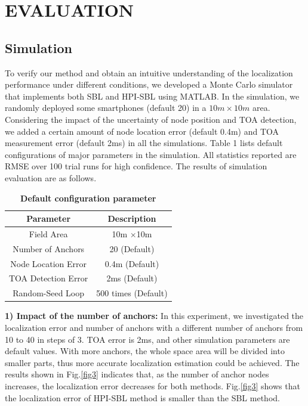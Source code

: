 \section{EVALUATION }
\label{section:results}

\subsection{Simulation}
To verify our method and obtain an intuitive understanding of the localization performance under different conditions,
we developed a Monte Carlo simulator that implements
both SBL and HPI-SBL using MATLAB. 
In the simulation, we randomly deployed some smartphones (default 20) in a $10m \times 10m$ area. 
Considering the impact of the uncertainty of node position and TOA detection, we added a certain amount of node location error (default 0.4m) and TOA measurement error (default 2ms) in all the simulations.
Table 1 lists default configurations of major parameters in the simulation.
All statistics reported are RMSE  over 100 trial runs for high confidence. The results of simulation evaluation are as follows.


\begin{table} \normalsize
\caption {\textbf{Default configuration parameter}} %
\centering %
    \begin{tabular}{|c|c|}
        \hline
\textbf{Parameter} & \textbf{Description} \\
 \hline
Field Area & 10m $\times$10m \\
\hline
Number of Anchors & 20 (Default) \\
 \hline
Node Location Error 	 & 0.4m (Default) \\
 \hline
TOA Detection Error 	 & 2ms (Default) \\
 \hline
Random-Seed Loop	 & 500 times (Default) \\
        \hline
    \end{tabular}
\end{table}


\textbf{1) Impact of the number of anchors:}
 In this experiment, we investigated the localization error and number of anchors with a different number of anchors from 10 to 40 in steps of 3. 
 TOA error is 2ms, and other simulation parameters are default values.
With more anchors, the whole space area will be divided into smaller parts, thus more accurate localization estimation could be achieved. 
The results shown in Fig.\ref{fig3} indicates that, as the number of anchor nodes increases, the localization error decreases for both methods.
Fig.\ref{fig3} shows that the localization error of HPI-SBL method is smaller than the SBL method.


